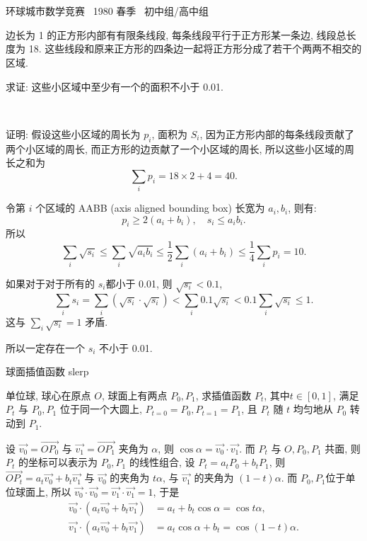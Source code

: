 ~

~

\newpage

\noindent 环球城市数学竞赛~ 1980 春季~ 初中组/高中组

边长为 1 的正方形内部有有限条线段, 
每条线段平行于正方形某一条边, 线段总长度为 18. 
这些线段和原来正方形的四条边一起将正方形分成了若干个两两不相交的区域.

求证: 这些小区域中至少有一个的面积不小于 0.01.

~

证明: 假设这些小区域的周长为 $ p_i $, 面积为 $ S_i $, 因为正方形内部的每条线段贡献了两个小区域的周长, 而正方形的边贡献了一个小区域的周长, 所以这些小区域的周长之和为 
\[ \sum_i{p_i} = 18\times 2 + 4 = 40 .\]

令第 $ i $ 个区域的 AABB (axis aligned bounding box) 长宽为 $ a_i, b_i $, 则有:
\[ p_i \ge 2(a_i+b_i),\quad s_i \le a_i b_i .\]
所以
\[ \sum_i{\sqrt{s_i}} \le \sum_i{\sqrt{a_i b_i}} \le \frac{1}{2}\sum_i{(a_i+b_i)} \le \frac{1}{4}\sum_i{p_i} = 10 .\]

如果对于对于所有的 $ s_i $都小于 0.01, 则 $ \sqrt{s_i} < 0.1 $, 
\[ \sum_i{s_i} = \sum_i{(\sqrt{s_i}\cdot\sqrt{s_i})} < \sum_i{0.1\sqrt{s_i}} < 0.1\sum_i{\sqrt{s_i}} \le 1 .\]
这与 $ \sum_i{\sqrt{s_i}} = 1 $ 矛盾.

所以一定存在一个 $ s_i $ 不小于 0.01.

\newpage

\noindent 球面插值函数 slerp 

单位球, 球心在原点 $O$, 球面上有两点 $P_0, P_1$, 求插值函数 $P_t$, 其中$t\in[0,1]$, 满足 $P_t$ 与 $P_0, P_1$ 位于同一个大圆上, $P_{t=0} = P_0, P_{t=1}=P_1$, 且 $P_t$ 随 $t$ 均匀地从 $P_0$ 转动到 $P_1$. 

设 $\vec{v_0} = \vec{OP_0}$ 与 $\vec{v_1} = \vec{OP_1}$ 夹角为 $\alpha$, 则 $\cos\alpha = \vec{v_0}\cdot\vec{v_1}$. 而 $P_t$ 与 $O,P_0, P_1$ 共面, 则 $P_t$ 的坐标可以表示为 $P_0, P_1$ 的线性组合, 设 $P_t = a_t P_0 + b_tP_1$, 则 $\vec{OP_t} = a_t \vec{v_0} + b_t \vec{v_1}$ 与 $\vec{v_0}$ 的夹角为 $t\alpha$, 与 $\vec{v_1}$ 的夹角为 $(1-t)\alpha$. 而 $P_0, P_1$位于单位球面上, 所以 $\vec{v_0}\cdot\vec{v_0}=\vec{v_1}\cdot\vec{v_1} = 1$, 于是
\begin{align*}
\vec{v_0}\cdot(a_t \vec{v_0} + b_t \vec{v_1}) &= a_t + b_t\cos\alpha = \cos t\alpha ,\\
\vec{v_1}\cdot(a_t \vec{v_0} + b_t \vec{v_1}) &= a_t\cos\alpha + b_t = \cos (1-t)\alpha .
\end{align*}

